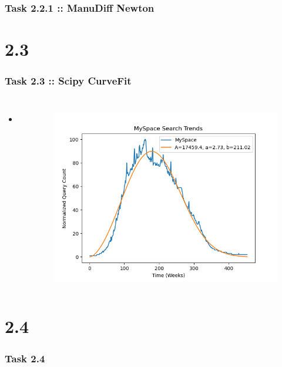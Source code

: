 \documentclass[10pt,aspectratio=169,handout]{beamer}
\begin{document}
\begin{frame}
    \frametitle{Task 2.2.1 :: ManuDiff Newton}
\end{frame}

\section{2.3}
\begin{frame}
    \frametitle{Task 2.3 :: Scipy CurveFit}
    \inputminted[bgcolor=LightGray,fontsize=\small]{python}{code/curve-fit.py}

    \begin{columns}
        \begin{column}{0.7\textwidth}
            \begin{itemize}
                \item ...
            \end{itemize}
        \end{column}
    
        \begin{column}{0.3\textwidth}
            \begin{figure}
                \includegraphics[width=\textwidth]{images/scicurvefit.png}
            \end{figure}
        \end{column}
        \end{columns}
\end{frame}

\section{2.4}
\begin{frame}
    \frametitle{Task 2.4}
\end{frame}
\end{document}
